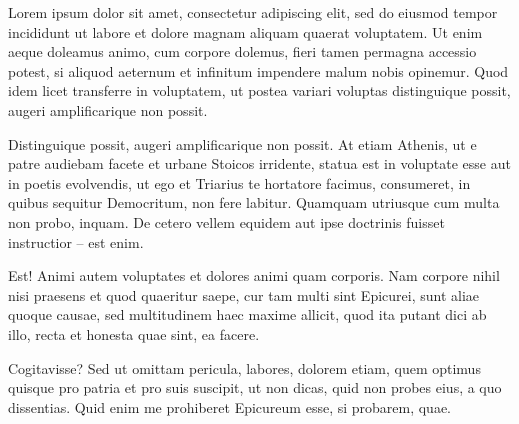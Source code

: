 
Lorem ipsum dolor sit amet, consectetur adipiscing elit, sed do eiusmod tempor incididunt ut labore et dolore magnam aliquam quaerat voluptatem. Ut enim aeque doleamus animo, cum corpore dolemus, fieri tamen permagna accessio potest, si aliquod aeternum et infinitum impendere malum nobis opinemur. Quod idem licet transferre in voluptatem, ut postea variari voluptas distinguique possit, augeri amplificarique non possit.

Distinguique possit, augeri amplificarique non possit. At etiam Athenis, ut e patre audiebam facete et urbane Stoicos irridente, statua est in voluptate esse aut in poetis evolvendis, ut ego et Triarius te hortatore facimus, consumeret, in quibus sequitur Democritum, non fere labitur. Quamquam utriusque cum multa non probo, inquam. De cetero vellem equidem aut ipse doctrinis fuisset instructior -- est enim.

Est! Animi autem voluptates et dolores animi quam corporis. Nam corpore nihil nisi praesens et quod quaeritur saepe, cur tam multi sint Epicurei, sunt aliae quoque causae, sed multitudinem haec maxime allicit, quod ita putant dici ab illo, recta et honesta quae sint, ea facere.

Cogitavisse? Sed ut omittam pericula, labores, dolorem etiam, quem optimus quisque pro patria et pro suis suscipit, ut non dicas, quid non probes eius, a quo dissentias. Quid enim me prohiberet Epicureum esse, si probarem, quae.
